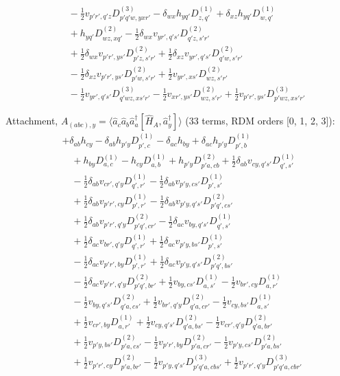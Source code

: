 \begin{align*}
&\quad -\tfrac12v_{p'r',q'z}D^{(3)}_{p'q'w,yxr'}-\delta_{wx}h_{yq'}D^{(1)}_{z,q'}+\delta_{xz}h_{yq'}D^{(1)}_{w,q'} \\
&\quad +h_{yq'}D^{(2)}_{wz,xq'}-\tfrac12\delta_{wx}v_{yr',q's'}D^{(2)}_{q'z,s'r'} \\
&\quad +\tfrac12\delta_{wx}v_{p'r',ys'}D^{(2)}_{p'z,s'r'}+\tfrac12\delta_{xz}v_{yr',q's'}D^{(2)}_{q'w,s'r'} \\
&\quad -\tfrac12\delta_{xz}v_{p'r',ys'}D^{(2)}_{p'w,s'r'}+\tfrac12v_{yr',xs'}D^{(2)}_{wz,s'r'} \\
&\quad -\tfrac12v_{yr',q's'}D^{(3)}_{q'wz,xs'r'}-\tfrac12v_{xr',ys'}D^{(2)}_{wz,s'r'}+\tfrac12v_{p'r',ys'}D^{(3)}_{p'wz,xs'r'}
\end{align*}

\noindent Attachment, $A_{(abc),y}=\langle \hat a_c\hat a_b\hat a_a^\dagger[\hat H_A,\hat a_y^\dagger]\rangle$ (33 terms, RDM orders [0, 1, 2, 3]):
\begin{align*}
&+\delta_{ab}h_{cy}-\delta_{ab}h_{p'y}D^{(1)}_{p',c}-\delta_{ac}h_{by}+\delta_{ac}h_{p'y}D^{(1)}_{p',b} \\
&\quad +h_{by}D^{(1)}_{a,c}-h_{cy}D^{(1)}_{a,b}+h_{p'y}D^{(2)}_{p'a,cb}+\tfrac12\delta_{ab}v_{cy,q's'}D^{(1)}_{q',s'} \\
&\quad -\tfrac12\delta_{ab}v_{cr',q'y}D^{(1)}_{q',r'}-\tfrac12\delta_{ab}v_{p'y,cs'}D^{(1)}_{p',s'} \\
&\quad +\tfrac12\delta_{ab}v_{p'r',cy}D^{(1)}_{p',r'}-\tfrac12\delta_{ab}v_{p'y,q's'}D^{(2)}_{p'q',cs'} \\
&\quad +\tfrac12\delta_{ab}v_{p'r',q'y}D^{(2)}_{p'q',cr'}-\tfrac12\delta_{ac}v_{by,q's'}D^{(1)}_{q',s'} \\
&\quad +\tfrac12\delta_{ac}v_{br',q'y}D^{(1)}_{q',r'}+\tfrac12\delta_{ac}v_{p'y,bs'}D^{(1)}_{p',s'} \\
&\quad -\tfrac12\delta_{ac}v_{p'r',by}D^{(1)}_{p',r'}+\tfrac12\delta_{ac}v_{p'y,q's'}D^{(2)}_{p'q',bs'} \\
&\quad -\tfrac12\delta_{ac}v_{p'r',q'y}D^{(2)}_{p'q',br'}+\tfrac12v_{by,cs'}D^{(1)}_{a,s'}-\tfrac12v_{br',cy}D^{(1)}_{a,r'} \\
&\quad -\tfrac12v_{by,q's'}D^{(2)}_{q'a,cs'}+\tfrac12v_{br',q'y}D^{(2)}_{q'a,cr'}-\tfrac12v_{cy,bs'}D^{(1)}_{a,s'} \\
&\quad +\tfrac12v_{cr',by}D^{(1)}_{a,r'}+\tfrac12v_{cy,q's'}D^{(2)}_{q'a,bs'}-\tfrac12v_{cr',q'y}D^{(2)}_{q'a,br'} \\
&\quad +\tfrac12v_{p'y,bs'}D^{(2)}_{p'a,cs'}-\tfrac12v_{p'r',by}D^{(2)}_{p'a,cr'}-\tfrac12v_{p'y,cs'}D^{(2)}_{p'a,bs'} \\
&\quad +\tfrac12v_{p'r',cy}D^{(2)}_{p'a,br'}-\tfrac12v_{p'y,q's'}D^{(3)}_{p'q'a,cbs'}+\tfrac12v_{p'r',q'y}D^{(3)}_{p'q'a,cbr'}
\end{align*}

